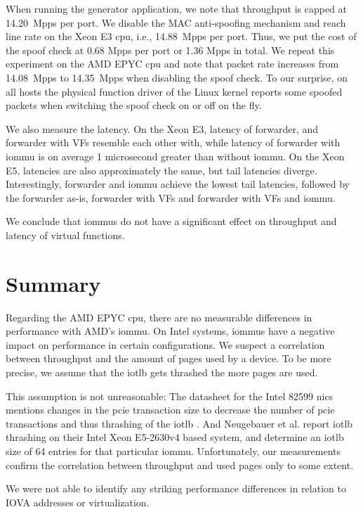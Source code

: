 When running the generator application, we note that throughput is capped at
14.20~Mpps per port. We disable the MAC anti-spoofing mechanism and reach line
rate on the Xeon E3 \ac{cpu}, i.e., 14.88~Mpps per port. Thus, we put the cost
of the spoof check at 0.68 Mpps per port or 1.36 Mpps in total. We repeat this
experiment on the AMD EPYC \ac{cpu} and note that packet rate increases from
14.08~Mpps to 14.35~Mpps when disabling the spoof check. To our surprise, on all
hosts the physical function driver of the Linux kernel reports some spoofed
packets when switching the spoof check on or off on the fly.

We also measure the latency. On the Xeon E3, latency of forwarder, and forwarder
with VFs resemble each other with, while latency of forwarder with \ac{iommu} is
on average 1 microsecond greater than without \ac{iommu}. On the Xeon E5,
latencies are also approximately the same, but tail latencies diverge.
Interestingly, forwarder and \ac{iommu} achieve the lowest tail latencies,
followed by the forwarder as-is, forwarder with VFs and forwarder with VFs and
\ac{iommu}.

We conclude that \acp{iommu} do not have a significant effect on throughput and
latency of virtual functions.


\section{Summary}
\label{sec:perf_summary}

Regarding the AMD EPYC \ac{cpu}, there are no measurable differences in
performance with AMD's \ac{iommu}. On Intel systems, \acp{iommu} have a negative
impact on performance in certain configurations. We suspect a correlation
between throughput and the amount of pages used by a device. To be more precise,
we assume that the \ac{iotlb} gets thrashed the more pages are used.

This assumption is not unreasonable: The datasheet for the Intel 82599 \acp{nic}
mentions changes in the \ac{pcie} transaction size to decrease the number of
\ac{pcie} transactions and thus thrashing of the \ac{iotlb}
\cite[p.~34]{intel2016datasheet}. And Neugebauer et al.
\cite{neugebauer2018understanding} report \ac{iotlb} thrashing on their Intel
Xeon E5-2630v4 based system, and determine an \ac{iotlb} size of 64 entries for
that particular \ac{iommu}. Unfortunately, our measurements confirm the
correlation between throughput and used pages only to some extent.

We were not able to identify any striking performance differences in relation to
IOVA addresses or virtualization.

